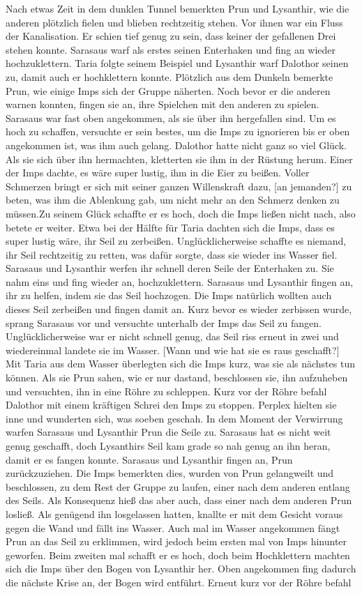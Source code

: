 \documentclass[10pt,twoside,twocolumn,openany]{book}
\begin{document}
	Nach etwas Zeit in dem dunklen Tunnel bemerkten Prun und Lysanthir, wie die anderen plötzlich fielen und blieben rechtzeitig stehen. Vor ihnen war ein Fluss der Kanalisation. Er schien tief genug zu sein, dass keiner der gefallenen Drei stehen konnte. Sarasaus warf als erstes seinen Enterhaken und fing an wieder hochzuklettern. Taria folgte seinem Beispiel und Lysanthir warf Dalothor seinen zu, damit auch er hochklettern konnte. Plötzlich aus dem Dunkeln bemerkte Prun, wie einige Imps sich der Gruppe näherten. Noch bevor er die anderen warnen konnten, fingen sie an, ihre Spielchen mit den anderen zu spielen. Sarasaus war fast oben angekommen, als sie über ihn hergefallen sind. Um es hoch zu schaffen, versuchte er sein bestes, um die Imps zu ignorieren bis er oben angekommen ist, was ihm auch gelang. Dalothor hatte nicht ganz so viel Glück. Als sie sich über ihn hermachten, kletterten sie ihm in der Rüstung herum. Einer der Imps dachte, es wäre super lustig, ihm in die Eier zu beißen. Voller Schmerzen bringt er sich mit seiner ganzen Willenskraft dazu, [an jemanden?] zu beten, was ihm die Ablenkung gab, um nicht mehr an den Schmerz denken zu müssen.Zu seinem Glück schaffte er es hoch, doch die Imps ließen nicht nach, also betete er weiter. Etwa bei der Hälfte für Taria dachten sich die Imps, dass es super lustig wäre, ihr Seil zu zerbeißen. Unglücklicherweise schaffte es niemand, ihr Seil rechtzeitig zu retten, was dafür sorgte, dass sie wieder ins Wasser fiel. Sarasaus und Lysanthir werfen ihr schnell deren Seile der Enterhaken zu. Sie nahm eins und fing wieder an, hochzuklettern. Sarasaus und Lysanthir fingen an, ihr zu helfen, indem sie das Seil hochzogen. Die Imps natürlich wollten auch dieses Seil zerbeißen und fingen damit an. Kurz bevor es wieder zerbissen wurde, sprang Sarasaus vor und versuchte unterhalb der Imps das Seil zu fangen. Unglücklicherweise war er nicht schnell genug, das Seil riss erneut in zwei und wiedereinmal landete sie im Wasser. [Wann und wie hat sie es raus geschafft?] Mit Taria aus dem Wasser überlegten sich die Imps kurz, was sie als nächstes tun können. Als sie Prun sahen, wie er nur dastand, beschlossen sie, ihn aufzuheben und versuchten, ihn in eine Röhre zu schleppen. Kurz vor der Röhre befahl Dalothor mit einem kräftigen Schrei den Imps zu stoppen. Perplex hielten sie inne und wunderten sich, was soeben geschah. In dem Moment der Verwirrung warfen Sarasaus und Lysanthir Prun die Seile zu. Sarasaus hat es nicht weit genug geschafft, doch Lysanthirs Seil kam grade so nah genug an ihn heran, damit er es fangen konnte. Sarasaus und Lysanthir fingen an, Prun zurückzuziehen. Die Imps bemerkten dies, wurden von Prun gelangweilt und beschlossen, zu dem Rest der Gruppe zu laufen, einer nach dem anderen  entlang des Seils. Als Konsequenz hieß das aber auch, dass einer nach dem anderen Prun losließ. Als genügend ihn losgelassen hatten, knallte er mit dem Gesicht voraus gegen die Wand und fällt ins Wasser. Auch mal im Wasser angekommen fängt Prun an das Seil zu erklimmen, wird jedoch beim ersten mal von Imps hinunter geworfen. Beim zweiten mal schafft er es hoch, doch beim Hochklettern machten sich die Imps über den Bogen von Lysanthir her. Oben angekommen fing dadurch die nächste Krise an, der Bogen wird entführt. Erneut kurz vor der Röhre befahl 
\end{document}
